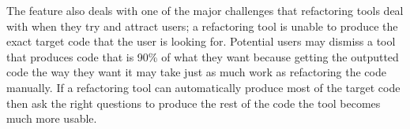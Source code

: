 The feature also deals with one of the major challenges that refactoring tools deal with when they try and attract users; a refactoring tool is unable to produce the exact target code that the user is looking for. Potential users may dismiss a tool that produces code that is 90\% of what they want because getting the outputted code the way they want it may take just as much work as refactoring the code manually. If a refactoring tool can automatically produce most of the target code then ask the right questions to produce the rest of the code the tool becomes much more usable. 





\cleardoublepage
{}
\label{index}
\printindex


